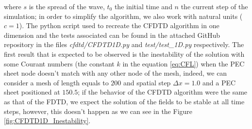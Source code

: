 \documentclass[12pt, oneside]{book}
\begin{document}
where $s$ is the spread of the wave, $t_0$ the initial time and $n$ the current step of the simulation; in order to simplify the algorithm, we also work with natural units ($c=1$). The python script used to recreate the CFDTD algorithm in one dimension and the tests associated can be found in the attached GitHub repository in the files \textit{cfdtd/CFDTD1D.py} and \textit{test/test\_1D.py} respectively. The first result that is expected to be observed is the inestability of the solution with some Courant numbers (the constant $k$ in the equation \ref{eq:CFL}) when the PEC sheet node doesn't match with any other node of the mesh, indeed, we can consider a mesh of length equals to $200$ and spatial step $\Delta x = 1.0$ and a PEC sheet positioned at $150.5$; if the behavior of the CFDTD algorithm were the same as that of the FDTD, we expect the solution of the fields to be stable at all time steps, however, this doesn't happen as we can see in the Figure \ref{fig:CFDTD1D_Inestability}.
\end{document}
